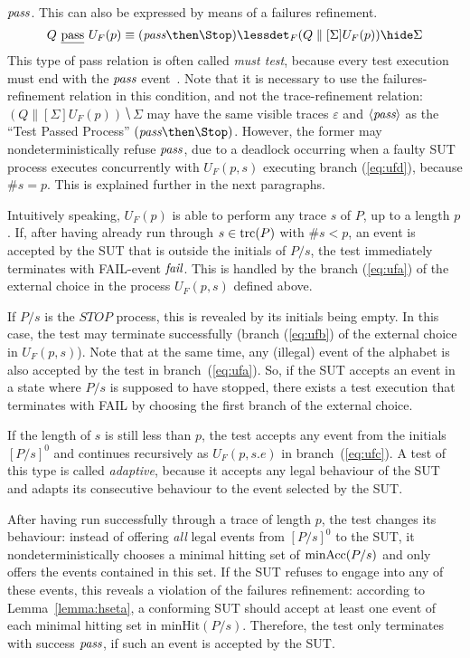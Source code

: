 ${\text{\it pass}}$. This can also be  expressed by means of a failures refinement.
\[
Q\ \pass\ U_F(p) \equiv (\epass\then\Stop) \lessdet_F (Q\parallel[\Sigma] U_F(p)) \hide \Sigma
\]
This type of pass relation is often called \emph{must test}, because every
test execution must end with the ${\text{\it pass}}$
event~\cite{Hennessy:1988:ATP:50497}. Note that it is necessary to use the
failures-refinement relation in this condition, and not the trace-refinement
relation:~$(Q\parallel[\Sigma] U_F(p)) \hide \Sigma$ may have  the same
visible traces $\varepsilon$ and $\langle {\text{\it pass}}\rangle$ as the ``Test Passed
Process'' $(\epass\then\Stop)$. However, the former may nondeterministically
refuse ${\text{\it pass}}$, due to a deadlock occurring when a faulty SUT process
executes concurrently with $U_F(p,s)$ executing branch (\ref{eq:ufd}),
because $\#s = p$. This is explained further in the next paragraphs.

Intuitively speaking, $U_F(p)$ is able to perform any trace $s$ of $P$, up to
a length $p$. If, after having already run through $s\in\text{trc}(P)$ with $\#s <
p$, an event is accepted by the SUT that is outside the initials of $P/s$,
the test immediately terminates with FAIL-event ${\text{\it fail}}$. This is handled by
the branch (\ref{eq:ufa}) of the external choice in the process $U_F(p,s)$
defined above.

If $P/s$ is the $STOP$ process, this is revealed by its initials being empty.
In this case, the test may terminate successfully (branch (\ref{eq:ufb}) of
the external choice in $U_F(p,s)$). Note that at the same time, any (illegal)
event of the alphabet is also accepted by the test in branch~(\ref{eq:ufa}).
So, if the SUT accepts an event in a state where $P/s$ is supposed to have
stopped, there exists a test execution that terminates with FAIL by choosing
the first branch of the external choice.

If the length of $s$ is still less than $p$, the test accepts any event from
the initials $[P/s]^0$ and continues recursively as $U_F(p,s.e)$ in
branch~(\ref{eq:ufc}). A test of this type is called \emph{adaptive}, because
it accepts any legal behaviour of the SUT and adapts its consecutive
behaviour to the event selected by the SUT.

After having  run successfully
through a trace of length $p$, the test changes its behaviour:
instead of offering {\it all} legal events from $[P/s]^0$ to the SUT,
it nondeterministically chooses
a minimal hitting set of $\text{minAcc}(P/s)$ and only offers the events contained in this set.
If the SUT refuses to engage into any of these events, this reveals a violation of the
failures refinement: according to Lemma~\ref{lemma:hseta}, a conforming SUT should accept
at least one event of each minimal hitting set in $\text{minHit}(P/s)$. Therefore, the test
only terminates with success ${\text{\it pass}}$, if such an event is accepted by the SUT.



